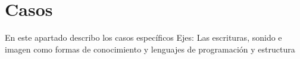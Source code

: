 \chapter{Casos}

En este apartado describo los casos específicos
Ejes: Las escrituras, sonido e imagen como formas de conocimiento y lenguajes de programación y estructura
